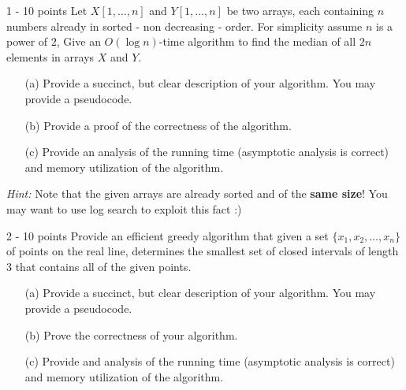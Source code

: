 \documentclass{common/cs157}
\begin{document}
\midtermpolicyremind{}

\begin{problem}{1 - 10 points}
Let $X[1,\ldots,n]$ and $Y[1,\ldots,n]$ be two arrays, each containing $n$ numbers already in sorted - non decreasing - order. For simplicity assume $n$ is a power of $2$, Give an $O(\log n)$-time algorithm to find the median of all $2n$ elements in arrays $X$ and $Y$.
\begin{enumerate}
    \item[(a)] Provide a succinct, but clear description of your algorithm. You may provide a pseudocode.
    \item[(b)] Provide a proof of the correctness of the algorithm.
    \item[(c)] Provide an analysis of the running time (asymptotic analysis is correct) and memory utilization of the algorithm.
\end{enumerate}
\noindent \emph{Hint:} Note that the given arrays are already sorted and of the \textbf{same size}! You may want to use log search to exploit this fact :)
\end{problem}


\begin{problem}{2 - 10 points}
Provide an efficient greedy algorithm that given a set $\{x_1,x_2,\ldots,x_n\}$ of points on the real line, determines the smallest set of  closed intervals of length 3 that contains all of the given points.
\begin{enumerate}
    \item[(a)] Provide a succinct, but clear description of your algorithm. You may provide a pseudocode.
    \item[(b)] Prove the correctness of your algorithm.
    \item[(c)] Provide and analysis of the running time (asymptotic analysis is correct) and memory utilization of the algorithm.
\end{enumerate}
\end{problem}
\end{document}
